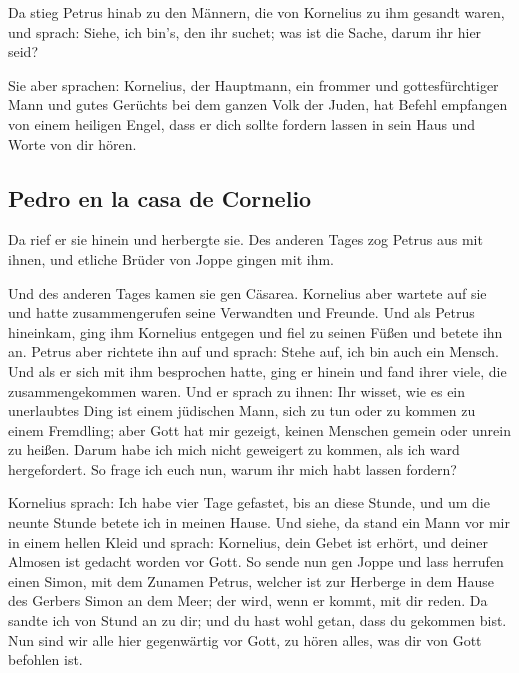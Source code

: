  Da stieg Petrus hinab zu den Männern, die von Kornelius
zu ihm gesandt waren, und sprach: Siehe, ich bin's, den ihr suchet; was
ist die Sache, darum ihr hier seid?

 Sie aber sprachen: Kornelius, der Hauptmann, ein frommer
und gottesfürchtiger Mann und gutes Gerüchts bei dem ganzen Volk der
Juden, hat Befehl empfangen von einem heiligen Engel, dass er dich
sollte fordern lassen in sein Haus und Worte von dir hören.

\hypertarget{pedro-en-la-casa-de-cornelio}{%
\subsection{Pedro en la casa de
Cornelio}\label{pedro-en-la-casa-de-cornelio}}

 Da rief er sie hinein und herbergte sie. Des anderen
Tages zog Petrus aus mit ihnen, und etliche Brüder von Joppe gingen mit
ihm.

 Und des anderen Tages kamen sie gen Cäsarea. Kornelius
aber wartete auf sie und hatte zusammengerufen seine Verwandten und
Freunde.  Und als Petrus hineinkam, ging ihm Kornelius
entgegen und fiel zu seinen Füßen und betete ihn an. 
Petrus aber richtete ihn auf und sprach: Stehe auf, ich bin auch ein
Mensch.  Und als er sich mit ihm besprochen hatte, ging
er hinein und fand ihrer viele, die zusammengekommen waren.
 Und er sprach zu ihnen: Ihr wisset, wie es ein
unerlaubtes Ding ist einem jüdischen Mann, sich zu tun oder zu kommen zu
einem Fremdling; aber Gott hat mir gezeigt, keinen Menschen gemein oder
unrein zu heißen.  Darum habe ich mich nicht geweigert zu
kommen, als ich ward hergefordert. So frage ich euch nun, warum ihr mich
habt lassen fordern?

 Kornelius sprach: Ich habe vier Tage gefastet, bis an
diese Stunde, und um die neunte Stunde betete ich in meinen Hause. Und
siehe, da stand ein Mann vor mir in einem hellen Kleid 
und sprach: Kornelius, dein Gebet ist erhört, und deiner Almosen ist
gedacht worden vor Gott.  So sende nun gen Joppe und lass
herrufen einen Simon, mit dem Zunamen Petrus, welcher ist zur Herberge
in dem Hause des Gerbers Simon an dem Meer; der wird, wenn er kommt, mit
dir reden.  Da sandte ich von Stund an zu dir; und du
hast wohl getan, dass du gekommen bist. Nun sind wir alle hier
gegenwärtig vor Gott, zu hören alles, was dir von Gott befohlen ist.

